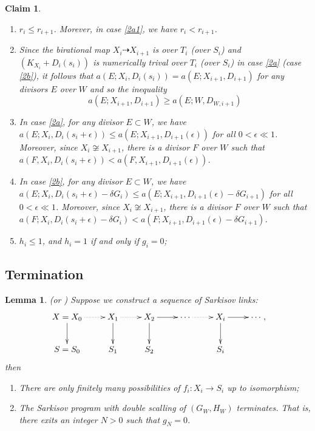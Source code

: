 \documentclass{article}
\newtheorem{lem}[defn]{Lemma}
\newtheorem{claim}[defn]{Claim}
\begin{document}
\begin{claim}\label{behavior2}
  \begin{enumerate}
    \item $r_{i}\leqslant r_{i+1}$. Morever, in case \ref{2a1}, we have $r_{i}<r_{i+1}$. 
    \item\label{2adicrepancy} Since the birational map $X_{i}\dashrightarrow X_{i+1}$ is over $T_{i}$ (over $S_{i}$) and $(K_{X_{i}}+D_{i}(s_{i}))$ is numerically trival over $T_{i}$ (over $S_{i}$) in case \ref{2a} (case \ref{2b}), it follows that $a(E;X_{i},D_{i}(s_{i}))= a(E;X_{i+1},D_{i+1})$ for any divisors $E$ over $W$ and so the inequality
    \[
      a(E;X_{i+1},D_{i+1})\geqslant a(E;W,D_{W,i+1})
    \]
  \item  In case \ref{2a}, for any divisor $E \subset W$, we have $a(E;X_{i},D_{i}(s_{i}+\epsilon))\leqslant a(E;X_{i+1},D_{i+1}(\epsilon))$ for all $0<\epsilon\ll 1$. Moreover, since $X_{i} \not\cong X_{i+1}$, there is a divisor $F$ over $W$ such that  $a(F,X_{i},D_{i}(s_{i}+\epsilon))< a(F,X_{i+1},D_{i+1}(\epsilon))$.

  \item\label{2bdiscrepancy}   In case \ref{2b}, for any divisor $E \subset W$, we have $a(E;X_{i},D_{i}(s_{i}+\epsilon)-\delta G_{i})\leqslant a(E;X_{i+1},D_{i+1}(\epsilon)-\delta G_{i+1})$ for all $0<\epsilon\ll 1$. Moreover, since $X_{i} \not\cong X_{i+1}$, there is a divisor $F$ over $W$ such that  $a(F;X_{i},D_{i}(s_{i}+\epsilon)-\delta G_{i})< a(F;X_{i+1},D_{i+1}(\epsilon)-\delta G_{i+1})$.
  \item  $h_{i}\leqslant 1$, and $h_{i}=1$ if and only if $g_{i}=0$;
  \end{enumerate}
\end{claim}
\subsection{Termination}
\begin{lem}\label{termination2}
\cite[Lemma 13.18 and Lemma 13.19]{haconSarkisovProgram2011} (or \cite[Lemma 4.9]{liuSarkisovProgramGeneralized2019}) Suppose we construct a sequence of Sarkisov links: 
\[
  \xymatrix{
    X=X_0\ar@{.>}[r]\ar[d]&X_{1}\ar@{.>}[r]\ar[d]& X_{2}\ar[d]\ar[r] &\cdots\ar@{.>}[r]&X_{i}\ar[d] \ar[r] &\cdots\\
    S=S_{0}&S_{1} &S_{2}&&S_{i}
  }
,\]
then
  \begin{enumerate}
    \item There are only finitely many possibilities of $f_{i}:X_{i}\to S_{i}$ up to isomorphism;
    \item The Sarkisov program with double scalling of $(G_{W},H_{W})$ terminates. That is, there exits an integer $N>0$ such that $g_{N}=0$.  
  \end{enumerate}
\end{lem}
\end{document}
